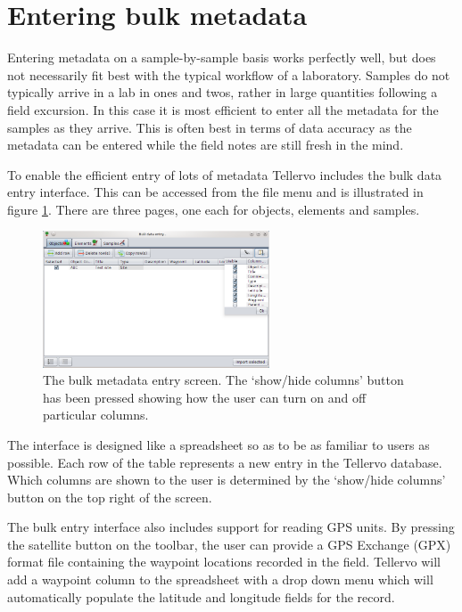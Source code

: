 

\section{Entering bulk metadata}
\label{txt:bulkentry}
Entering metadata on a sample-by-sample basis works perfectly well, but does not necessarily fit best with the typical workflow of a laboratory.  Samples do not typically arrive in a lab in ones and twos, rather in large quantities following a field excursion.  In this case it is most efficient to enter all the metadata for the samples as they arrive.  This is often best in terms of data accuracy as the metadata can be entered while the field notes are still fresh in the mind.

To enable the efficient entry of lots of metadata Tellervo includes the bulk data entry interface.  This can be accessed from the file menu and is illustrated in figure \ref{fig:bulkentry}.  There are three pages, one each for objects, elements and samples.

\begin{figure}
\centering
\includegraphics[width=0.6\textwidth]{Images/bulkentry.png}
\caption{The bulk metadata entry screen.  The `show/hide columns' button has been pressed showing how the user can turn on and off particular columns.} 
\label{fig:bulkentry}
\end{figure}

The interface is designed like a spreadsheet so as to be as familiar to users as possible.  Each row of the table represents a new entry in the Tellervo database.  Which columns are shown to the user is determined by the `show/hide columns' button on the top right of the screen.  

The bulk entry interface also includes support for reading GPS units.  By pressing the satellite button on the toolbar, the user can provide a GPS Exchange (GPX) format file containing the waypoint locations recorded in the field.   Tellervo will add a waypoint column to the spreadsheet with a drop down menu which will automatically populate the latitude and longitude fields for the record. 


